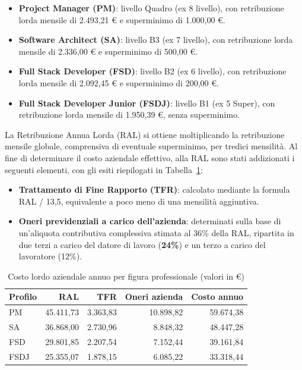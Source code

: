\begin{itemize}
    \item \textbf{Project Manager (PM)}: livello Quadro (ex 8\textdegree{} livello), con retribuzione lorda mensile di 2.493,21 \euro{} e superminimo di 1.000,00 \euro{}.
    \item \textbf{Software Architect (SA)}: livello B3 (ex 7\textdegree{} livello), con retribuzione lorda mensile di 2.336,00 \euro{} e superminimo di 500,00 \euro{}.
    \item \textbf{Full Stack Developer (FSD)}: livello B2 (ex 6\textdegree{} livello), con retribuzione lorda mensile di 2.092,45 \euro{} e superminimo di 200,00 \euro{}.
    \item \textbf{Full Stack Developer Junior (FSDJ)}: livello B1 (ex 5\textdegree{} Super), con retribuzione lorda mensile di 1.950,39 \euro{}, senza superminimo.
\end{itemize}

La Retribuzione Annua Lorda (RAL) si ottiene moltiplicando la retribuzione mensile globale, comprensiva di eventuale superminimo, per tredici mensilit\`a. Al fine di determinare il costo aziendale effettivo, alla RAL sono stati addizionati i seguenti elementi, con gli esiti riepilogati in Tabella~\ref{tab:costo-personale}:

\begin{itemize}
    \item \textbf{Trattamento di Fine Rapporto (TFR)}: calcolato mediante la formula RAL / 13,5, equivalente a poco meno di una mensilit\`a aggiuntiva.
    \item \textbf{Oneri previdenziali a carico dell'azienda}: determinati sulla base di un'aliquota contributiva complessiva stimata al 36\% della RAL, ripartita in due terzi a carico del datore di lavoro (\textbf{24\%}) e un terzo a carico del lavoratore (12\%).
\end{itemize}

\begin{table}[H]
\centering
\begin{tabular}{lrrrr}
\hline
\textbf{Profilo} & \textbf{RAL} & \textbf{TFR} & \textbf{Oneri azienda} & \textbf{Costo annuo} \\
\hline
PM   & 45.411,73 & 3.363,83 & 10.898,82 & 59.674,38 \\
SA   & 36.868,00 & 2.730,96 &  8.848,32 & 48.447,28 \\
FSD  & 29.801,85 & 2.207,54 &  7.152,44 & 39.161,84 \\
FSDJ & 25.355,07 & 1.878,15 &  6.085,22 & 33.318,44 \\
\hline
\end{tabular}
\caption{Costo lordo aziendale annuo per figura professionale (valori in \euro)}
\label{tab:costo-personale}
\end{table}

